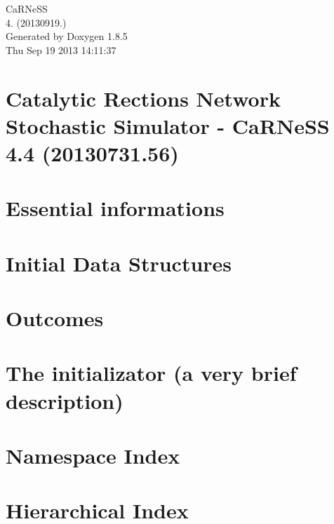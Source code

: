 \documentclass[twoside]{book}
\newcommand{\clearemptydoublepage}{%
  \newpage{\pagestyle{empty}\cleardoublepage}%
}
\begin{document}
\hypersetup{pageanchor=false}
\begin{titlepage}
\vspace*{7cm}
\begin{center}%
{\Large Ca\-R\-Ne\-S\-S \\[1ex]\large 4. (20130919.) }\\
\vspace*{1cm}
{\large Generated by Doxygen 1.8.5}\\
\vspace*{0.5cm}
{\small Thu Sep 19 2013 14:11:37}\\
\end{center}
\end{titlepage}
\clearemptydoublepage
\tableofcontents
\clearemptydoublepage
{}
\hypersetup{pageanchor=true}

\chapter{Catalytic Rections Network Stochastic Simulator -\/ Ca\-R\-Ne\-S\-S 4.4 (20130731.56)}
\label{index}\hypertarget{index}{}
\chapter{Essential informations}
\label{intro}
\hypertarget{intro}{}

\chapter{Initial Data Structures}
\label{page_init_str}
\hypertarget{page_init_str}{}

\chapter{Outcomes}
\label{pageoutcomes}
\hypertarget{pageoutcomes}{}

\chapter{The initializator (a very brief description)}
\label{page_initializator}
\hypertarget{page_initializator}{}

\chapter{Namespace Index}

\chapter{Hierarchical Index}

\end{document}
